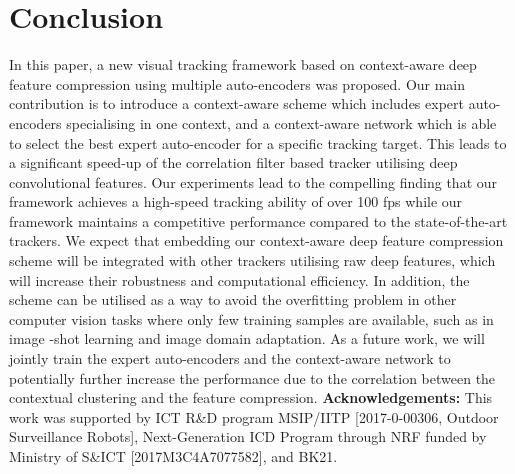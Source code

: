 \documentclass[10pt,twocolumn,letterpaper]{article}
\begin{document}
\section{Conclusion}
\vspace{-3mm}
In this paper, a new visual tracking framework based on context-aware deep feature compression using multiple auto-encoders was proposed. 
Our main contribution is to introduce a context-aware scheme which includes expert auto-encoders specialising in one context, and a context-aware network which is able to select the best expert auto-encoder for a specific tracking target.
This leads to a significant speed-up of the correlation filter based tracker utilising deep convolutional features. Our experiments lead to the compelling finding that our framework achieves a high-speed tracking ability of over 100 fps while our framework maintains a competitive performance compared to the state-of-the-art trackers. We expect that embedding our context-aware deep feature compression scheme will be integrated with other trackers utilising raw deep features, which will increase their robustness and computational efficiency.
In addition, the scheme can be utilised as a way to avoid the overfitting problem in other computer vision tasks where only few training samples are available, such as in image -shot learning and image domain adaptation.
As a future work, we will jointly train the expert auto-encoders and the context-aware network to potentially further increase the performance due to the correlation between the contextual clustering and the feature compression. 
\vspace{1mm}
\footnotesize
\noindent\textbf{Acknowledgements:} 
This work was supported by  ICT R\&D program MSIP/IITP [2017-0-00306, Outdoor Surveillance Robots], Next-Generation ICD Program through NRF funded by Ministry of S\&ICT [2017M3C4A7077582], 
and BK21.
\normalsize


{\small


}
\end{document}
